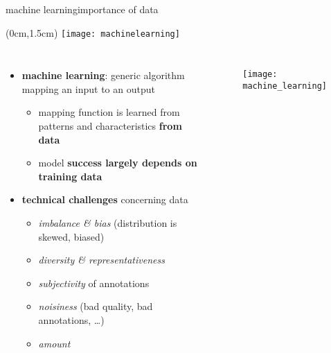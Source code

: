 \begin{frame}{machine learning}{importance of data}
    \vspace{-5mm}
    \begin{textblock*}{100mm}(0cm,1.5cm)
        \texttt{[image: machinelearning]}
    \end{textblock*}           
    
    \begin{columns}
    \begin{itemize}
 
        \item<1->   \textbf{machine learning}: generic algorithm mapping an input to an output
            \begin{itemize}
                \item   mapping function is learned from patterns and characteristics \textbf{from data}
                \item<2->[$\Rightarrow$]   model \textbf{success largely depends on training data}
                
            \end{itemize}
        \bigskip
        \item<3->   \textbf{technical challenges} concerning data
            \begin{itemize}
                \item   \textit{imbalance \& bias} (distribution is skewed, biased)
                \item   \textit{diversity \& representativeness} %
                \item   \textit{subjectivity} of annotations
                \item   \textit{noisiness} (bad quality, bad annotations, \ldots)
                \item   \textit{amount}
            \end{itemize}
    \end{itemize}
        \vspace{-5mm}
        \begin{figure}
            \texttt{[image: machine\_learning]}
        \end{figure}
    \end{columns}
\end{frame}

